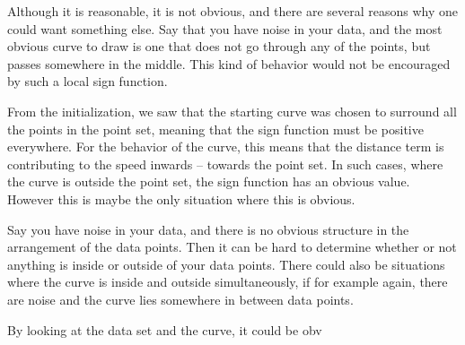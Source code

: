 Although it is reasonable, it is not obvious, and there are several reasons why one could want something else. Say that you have noise in your data, and the most obvious curve to draw is one that does not go through any of the points, but passes somewhere in the middle. This kind of behavior would not be encouraged by such a local sign function. 


From the initialization, we saw that the starting curve was chosen to surround all the points in the point set, meaning that the sign function must be positive everywhere. For the behavior of the curve, this means that the distance term is contributing to the speed inwards -- towards the point set. In such cases, where the curve is outside the point set, the sign function has an obvious value. However this is maybe the only situation where this is obvious. 

Say you have noise in your data, and there is no obvious structure in the arrangement of the data points. Then it can be hard to determine whether or not anything is inside or outside of your data points. There could also be situations where the curve is inside and outside simultaneously, if for example again, there are noise and the curve lies somewhere in between data points.

By looking at the data set and the curve, it could be obv

\clearpage